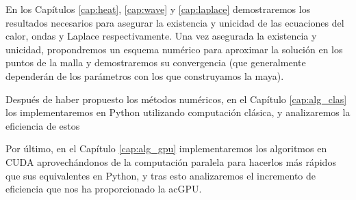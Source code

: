 En los Capítulos \ref{cap:heat}, \ref{cap:wave} y \ref{cap:laplace} demostraremos los resultados necesarios para asegurar la existencia y unicidad de las ecuaciones del calor, ondas y Laplace respectivamente. Una vez asegurada la existencia y unicidad, propondremos un esquema numérico para aproximar la solución en los puntos de la malla y demostraremos su convergencia (que generalmente dependerán de los parámetros con los que construyamos la maya).

Después de haber propuesto los métodos numéricos, en el Capítulo \ref{cap:alg_clas} los implementaremos en Python utilizando computación clásica, y analizaremos la eficiencia de estos

Por último, en el Capítulo \ref{cap:alg_gpu} implementaremos los algoritmos en \ac{CUDA} aprovechándonos de la computación paralela para hacerlos más rápidos que sus equivalentes en Python, y tras esto analizaremos el incremento de eficiencia que nos ha proporcionado la ac{GPU}.
